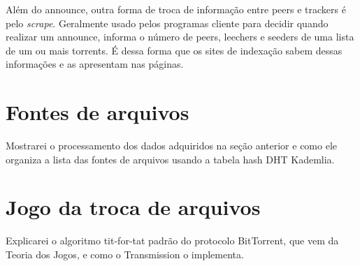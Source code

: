 Além do \gls*{announce}, outra forma de troca de informação entre \glspl*{peer} e
\glspl*{tracker} é pelo \emph{scrape}. Geralmente usado pelos programas cliente para
decidir quando realizar um \gls*{announce}, informa o número de \glspl*{peer},
\glspl*{leecher} e \glspl*{seeder} de uma lista de um ou mais \glspl*{torrent}. É dessa
forma que os sites de indexação sabem dessas informações e as apresentam nas páginas.


\section{Fontes de arquivos}

Mostrarei o processamento dos dados adquiridos na seção anterior e como ele organiza a lista das fontes de arquivos usando a tabela hash DHT Kademlia.

\section{Jogo da troca de arquivos}
\label{titfortat}

Explicarei o algoritmo tit-for-tat padrão do protocolo BitTorrent, que vem da Teoria dos Jogos, e como o Transmission o implementa.

\afterpage{\clearpage}